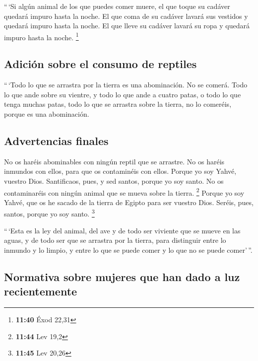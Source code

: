  ``\,`Si algún animal de los que puedes comer muere, el
que toque su cadáver quedará impuro hasta la noche.  El
que coma de su cadáver lavará sus vestidos y quedará impuro hasta la
noche. El que lleve su cadáver lavará su ropa y quedará impuro hasta la
noche. \footnote{\textbf{11:40} Éxod 22,31}

\hypertarget{adiciuxf3n-sobre-el-consumo-de-reptiles}{%
\subsection{Adición sobre el consumo de
reptiles}\label{adiciuxf3n-sobre-el-consumo-de-reptiles}}

 ``\,`Todo lo que se arrastra por la tierra es una
abominación. No se comerá.  Todo lo que ande sobre su
vientre, y todo lo que ande a cuatro patas, o todo lo que tenga muchas
patas, todo lo que se arrastra sobre la tierra, no lo comeréis, porque
es una abominación.

\hypertarget{advertencias-finales}{%
\subsection{Advertencias finales}\label{advertencias-finales}}

 No os haréis abominables con ningún reptil que se
arrastre. No os haréis inmundos con ellos, para que os contaminéis con
ellos.  Porque yo soy Yahvé, vuestro Dios. Santificaos,
pues, y sed santos, porque yo soy santo. No os contaminaréis con ningún
animal que se mueva sobre la tierra. \footnote{\textbf{11:44} Lev 19,2}
 Porque yo soy Yahvé, que os he sacado de la tierra de
Egipto para ser vuestro Dios. Seréis, pues, santos, porque yo soy santo.
\footnote{\textbf{11:45} Lev 20,26}

 ``\,`Esta es la ley del animal, del ave y de todo ser
viviente que se mueve en las aguas, y de todo ser que se arrastra por la
tierra,  para distinguir entre lo inmundo y lo limpio, y
entre lo que se puede comer y lo que no se puede comer'\,''.

\hypertarget{normativa-sobre-mujeres-que-han-dado-a-luz-recientemente}{%
\subsection{Normativa sobre mujeres que han dado a luz
recientemente}\label{normativa-sobre-mujeres-que-han-dado-a-luz-recientemente}}

